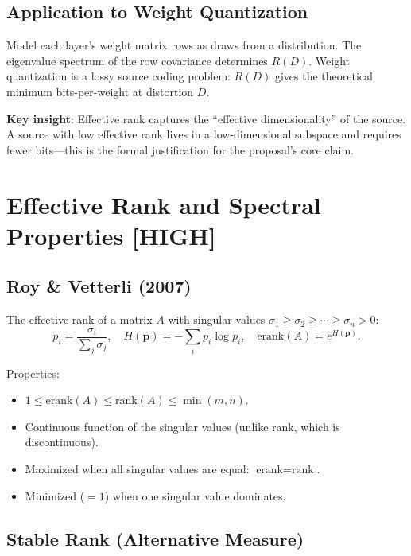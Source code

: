 \documentclass[11pt,a4paper]{article}
\begin{document}
\subsection{Application to Weight Quantization}

Model each layer's weight matrix rows as draws from a distribution. The eigenvalue spectrum of the row covariance determines $R(D)$. Weight quantization is a lossy source coding problem: $R(D)$ gives the theoretical minimum bits-per-weight at distortion $D$.

\textbf{Key insight}: Effective rank captures the ``effective dimensionality'' of the source. A source with low effective rank lives in a low-dimensional subspace and requires fewer bits---this is the formal justification for the proposal's core claim.

\section{Effective Rank and Spectral Properties \textnormal{\textcolor{red!70!black}{[HIGH]}}}

\subsection{Roy \& Vetterli (2007) \cite{roy2007effective}}

The effective rank of a matrix $A$ with singular values $\sigma_1 \geq \sigma_2 \geq \cdots \geq \sigma_n > 0$:
\begin{equation}
    p_i = \frac{\sigma_i}{\sum_j \sigma_j}, \quad H(\mathbf{p}) = -\sum_i p_i \log p_i, \quad \text{erank}(A) = e^{H(\mathbf{p})}.
\end{equation}

Properties:
\begin{itemize}
    \item $1 \leq \text{erank}(A) \leq \text{rank}(A) \leq \min(m,n)$.
    \item Continuous function of the singular values (unlike rank, which is discontinuous).
    \item Maximized when all singular values are equal: $\text{erank} = \text{rank}$.
    \item Minimized ($= 1$) when one singular value dominates.
\end{itemize}

\subsection{Stable Rank (Alternative Measure)}
\end{document}
